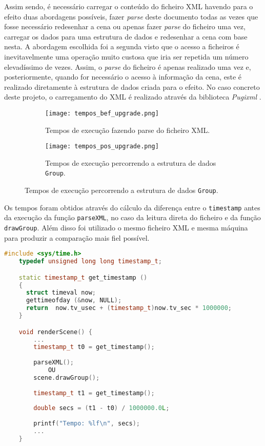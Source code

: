 \documentclass[a4paper]{article}
\begin{document}
Assim sendo, é necessário carregar o conteúdo do ficheiro XML havendo para o efeito duas abordagens possíveis, fazer \textit{parse} deste documento todas as vezes que fosse necessário redesenhar a cena ou apenas fazer \textit{parse} do ficheiro uma vez, carregar os dados para uma estrutura de dados e redesenhar a cena com base nesta. A abordagem escolhida foi a segunda visto que o acesso a ficheiros é inevitavelmente uma operação muito custosa que iria ser repetida um número elevadíssimo de vezes. Assim, o \textit{parse} do ficheiro é apenas realizado uma vez e, posteriormente, quando for necessário o acesso à informação da cena, este é realizado diretamente à estrutura de dados criada para o efeito. No caso concreto deste projeto, o carregamento do XML é realizado através da biblioteca \textit{Pugixml} \cite{pugixml}.

\begin{figure}[h]
    \centering
    \begin{subfigure}{0.5\textwidth}
        \centering
        \texttt{[image: tempos\_bef\_upgrade.png]}
        \caption{Tempos de execução fazendo parse do ficheiro XML.}
    \end{subfigure}%
    \begin{subfigure}{0.5\textwidth}
        \centering
        \texttt{[image: tempos\_pos\_upgrade.png]}
        \caption{Tempos de execução percorrendo a estrutura de dados \texttt{Group}.}
    \end{subfigure}
    \label{fig:tempos}
\end{figure}

\newpage

Os tempos foram obtidos através do cálculo da diferença entre o \texttt{timestamp} antes da execução da função \texttt{parseXML}, no caso da leitura direta do ficheiro e da função \texttt{drawGroup}. Além disso foi utilizado o mesmo ficheiro XML e mesma máquina para produzir a comparação mais fiel possível.

\begin{lstlisting}[language=C++, caption=Função usada na obtenção dos tempos de execução.]
    #include <sys/time.h>
    typedef unsigned long long timestamp_t;

    static timestamp_t get_timestamp ()
    {
      struct timeval now;
      gettimeofday (&now, NULL);
      return  now.tv_usec + (timestamp_t)now.tv_sec * 1000000;
    }

    void renderScene() {
        ...
        timestamp_t t0 = get_timestamp();
        
        parseXML(); 
            OU 
        scene.drawGroup();
        
        timestamp_t t1 = get_timestamp();
    
        double secs = (t1 - t0) / 1000000.0L;
        
        printf("Tempo: %lf\n", secs);
        ...
    }
\end{lstlisting}
\end{document}
